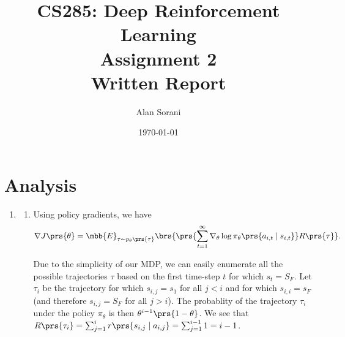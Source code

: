 \documentclass[10pt]{article}
\title{CS285: Deep Reinforcement Learning \\ Assignment 2 \\ Written Report}
\author{Alan Sorani}
\date{\today}
\theoremstyle{definition}
\begin{document}
\maketitle

\section{Analysis}

\begin{enumerate}
\item
\begin{enumerate}[label=(\alph*)]
\item
Using policy gradients, we have
\begin{equation} \label{1-policy-gradients}
\nabla J\prs{\theta} = \mbb{E}_{\tau \sim p_\theta\prs{\tau}} \brs{\prs{\sum_{t = 1}^\infty \nabla_\theta \log \pi_\theta\prs{a_{i,t} \mid s_{i,t}}} R\prs{\tau}} \text{.}
\end{equation}

Due to the simplicity of our MDP, we can easily enumerate all the possible trajectories $\tau$ based on the first time-step $t$ for which $s_t = S_F$. Let $\tau_i$ be the trajectory for which $s_{i,j} = s_1$ for all $j < i$ and for which $s_{i,i} = s_F$ (and therefore $s_{i,j} = S_F$ for all $j > i$). The probablity of the trajectory $\tau_i$ under the policy $\pi_{\theta}$ is then $\theta^{i-1} \prs{1 - \theta}$. We see that $R\prs{\tau_i} = \sum_{j=1}^{i} r\prs{s_{i,j} \mid a_{i,j}} = \sum_{j=1}^{i-1} 1 = i-1$.


\end{enumerate}
\end{enumerate}
\end{document}
